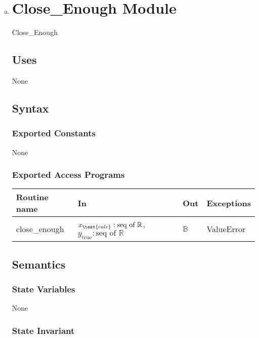 \documentclass[12pt]{article}
\begin{document}
\begin{enumerate}[a)]
\item 

\section* {Close\_Enough Module}

Close\_Enough

\subsection* {Uses}

None

\subsection* {Syntax}

\subsubsection* {Exported Constants}

None

\subsubsection* {Exported Access Programs}

\begin{tabular}{| l | l | l | p{5cm} |}
  \hline
  \textbf{Routine name} & \textbf{In} & \textbf{Out} & \textbf{Exceptions}\\
  \hline
  close\_enough & $x_\test{calc}: \text{seq of }\mathbb{R}$, $y_\text{true}: \text{seq of } \mathbb{R}$ & $\mathbb{B}$ & ValueError\\
  \hline
\end{tabular}

\subsection* {Semantics}

\subsubsection* {State Variables}

None

\subsubsection* {State Invariant}


\end{enumerate}
\end{document}
